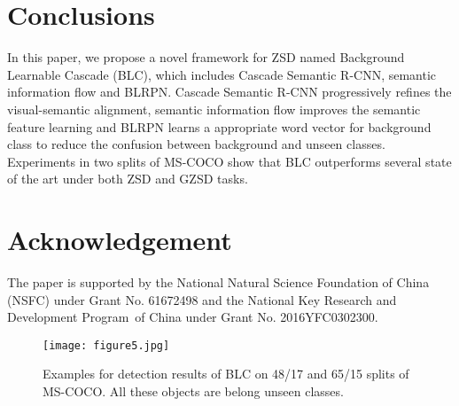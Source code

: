 \documentclass[runningheads]{llncs}
\begin{document}
\section{Conclusions}
In this paper, we propose a novel framework for ZSD named Background Learnable Cascade (BLC), which includes Cascade Semantic R-CNN, semantic information flow and BLRPN. Cascade Semantic R-CNN progressively refines the visual-semantic alignment, semantic information flow improves the semantic feature learning and BLRPN learns a appropriate word vector for background class to reduce the confusion between background and unseen classes. Experiments in two splits of MS-COCO show that BLC outperforms several state of the art under both ZSD and GZSD tasks.

\section*{Acknowledgement}
The paper is supported by the National Natural Science Foundation of China (NSFC) under Grant No. 61672498 and the National Key Research and Development Program of China under Grant No. 2016YFC0302300.
\begin{figure}[tbp]
\centering
\texttt{[image: figure5.jpg]}
\caption{Examples for detection results of BLC on 48/17 and 65/15 splits of MS-COCO. All these objects are belong unseen classes.}
\label{fig:figure5}
\end{figure}


\end{document}
